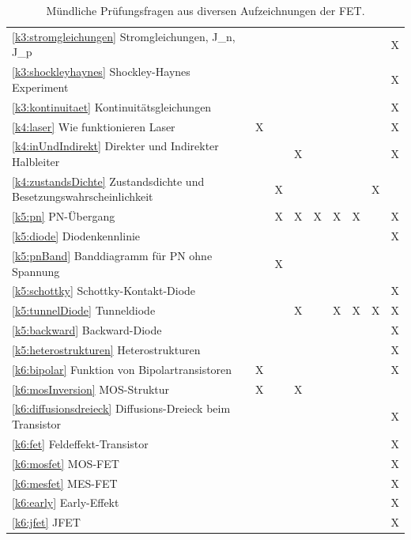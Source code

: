 \documentclass{article}
\begin{document}
\begin{center}
\begin{table}[H]
\begin{adjustbox}{width=\textwidth}
\begin{tabular}{lcccccccc}
\ref{k3:stromgleichungen} Stromgleichungen, J\_n, J\_p &&&&&&&& X \\
\ref{k3:shockleyhaynes} Shockley-Haynes Experiment &&&&&&&& X \\
\ref{k3:kontinuitaet} Kontinuit\"atsgleichungen &&&&&&&& X \\
\ref{k4:laser} Wie funktionieren Laser & X &&&&&&& X\\
\ref{k4:inUndIndirekt} Direkter und Indirekter Halbleiter&&& X &&&&& X \\
\ref{k4:zustandsDichte} Zustandsdichte und Besetzungswahrscheinlichkeit && X &&&&& X \\
\ref{k5:pn} PN-\"Ubergang && X & X & X &X&X&& X \\
\ref{k5:diode} Diodenkennlinie &&&&&&&& X \\
\ref{k5:pnBand} Banddiagramm f\"ur PN ohne Spannung  && X &&&&&& \\
\ref{k5:schottky} Schottky-Kontakt-Diode &&&&&&&& X \\
\ref{k5:tunnelDiode} Tunneldiode&&& X && X & X & X & X \\
\ref{k5:backward} Backward-Diode &&&&&&&& X \\
\ref{k5:heterostrukturen} Heterostrukturen &&&&&&&& X \\
\ref{k6:bipolar} Funktion von Bipolartransistoren & X &&&&&&& X \\
\ref{k6:mosInversion} MOS-Struktur & X && X &&&&& \\
\ref{k6:diffusionsdreieck} Diffusions-Dreieck beim Transistor &&&&&&&& X \\
\ref{k6:fet} Feldeffekt-Transistor &&&&&&&& X \\
\ref{k6:mosfet} MOS-FET &&&&&&&& X \\
\ref{k6:mesfet} MES-FET &&&&&&&& X \\
\ref{k6:early} Early-Effekt &&&&&&&& X \\
\ref{k6:jfet} JFET &&&&&&&& X \\

\hline

\hline

\end{tabular}
\end{adjustbox}
\caption{Mündliche Prüfungsfragen aus diversen Aufzeichnungen der FET.}
\end{table}
\end{center}

\end{document}
